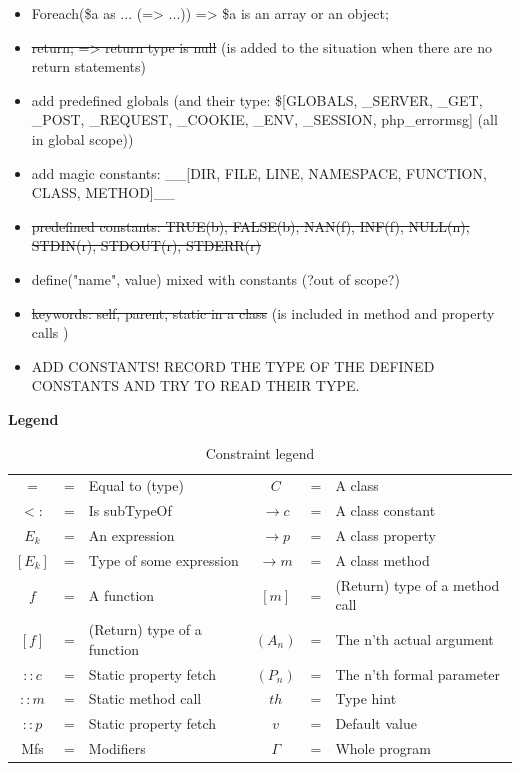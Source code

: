 \documentclass[../main.tex]{subfiles}
\begin{document}
\begin{itemize}
        \item Foreach(\$a as ... (=> ...)) => \$a is an array or an object;
        \item \sout{return; => return type is null} (is added to the situation when there are no return statements)
        \item add predefined globals (and their type: \$[GLOBALS, \_SERVER, \_GET, \_POST, \_REQUEST, \_COOKIE, \_ENV, \_SESSION, php\_errormsg] (all in global scope))
        \item add magic constants: \_\_[DIR, FILE, LINE, NAMESPACE, FUNCTION, CLASS, METHOD]\_\_
        \item \sout{predefined constants: TRUE(b), FALSE(b), NAN(f), INF(f), NULL(n), STDIN(r), STDOUT(r), STDERR(r)}
        \item define("name", value) mixed with constants (?out of scope?)
        \item \sout{keywords: self, parent, static in a class} (is included in method and property calls    )
        \item ADD CONSTANTS! RECORD THE TYPE OF THE DEFINED CONSTANTS AND TRY TO READ THEIR TYPE.    
    \end{itemize}

    \hrulefill
    
    \textbf{Legend} \\
    \begin{table}[H]
        \begin{tabular}{ c c l c c l }
            $=$     & = & Equal to (type) &
            $C$     & = & A class \\
            $<:$    & = & Is subTypeOf &
            $\rightarrow c$     & = & A class constant \\
            $E_k$   & = & An expression &
            $\rightarrow p$     & = & A class property \\
            $[E_k]$ & = & Type of some expression &
            $\rightarrow m$     & = & A class method \\
            $f$     & = & A function &
            $[m]$   & = & (Return) type of a method call \\
            $[f]$   & = & (Return) type of a function &
            $(A_n)$ & = & The n'th actual argument \\
            $::c$   & = & Static property fetch &
            $(P_n)$ & = & The n'th formal parameter \\
            $::m$   & = & Static method call &
            $th$    & = & Type hint \\
            $::p$   & = & Static property fetch &
            $v$     & = & Default value \\
            Mfs     & = & Modifiers &
            $\Gamma$ & = & Whole program 
            
            
        \end{tabular}
        \caption{Constraint legend}
        \label{table:constraintLegend}
    \end{table}
    
\end{document}

